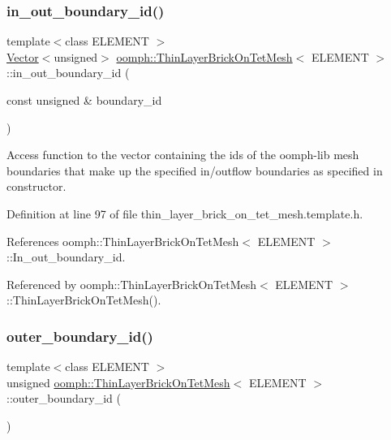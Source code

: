 \subsubsection{\texorpdfstring{in\+\_\+out\+\_\+boundary\+\_\+id()}{in\_out\_boundary\_id()}}
{\footnotesize\ttfamily template$<$class E\+L\+E\+M\+E\+NT $>$ \\
\hyperlink{classoomph_1_1Vector}{Vector}$<$unsigned$>$ \hyperlink{classoomph_1_1ThinLayerBrickOnTetMesh}{oomph\+::\+Thin\+Layer\+Brick\+On\+Tet\+Mesh}$<$ E\+L\+E\+M\+E\+NT $>$\+::in\+\_\+out\+\_\+boundary\+\_\+id (\begin{DoxyParamCaption}\item[{const unsigned \&}]{boundary\+\_\+id }\end{DoxyParamCaption})\hspace{0.3cm}{\ttfamily [inline]}}



Access function to the vector containing the ids of the oomph-\/lib mesh boundaries that make up the specified in/outflow boundaries as specified in constructor. 



Definition at line 97 of file thin\+\_\+layer\+\_\+brick\+\_\+on\+\_\+tet\+\_\+mesh.\+template.\+h.



References oomph\+::\+Thin\+Layer\+Brick\+On\+Tet\+Mesh$<$ E\+L\+E\+M\+E\+N\+T $>$\+::\+In\+\_\+out\+\_\+boundary\+\_\+id.



Referenced by oomph\+::\+Thin\+Layer\+Brick\+On\+Tet\+Mesh$<$ E\+L\+E\+M\+E\+N\+T $>$\+::\+Thin\+Layer\+Brick\+On\+Tet\+Mesh().

\mbox{\label{classoomph_1_1ThinLayerBrickOnTetMesh_aa753cb61dc2b1ed692dff8feeff67930}} 
\subsubsection{\texorpdfstring{outer\+\_\+boundary\+\_\+id()}{outer\_boundary\_id()}}
{\footnotesize\ttfamily template$<$class E\+L\+E\+M\+E\+NT $>$ \\
unsigned \hyperlink{classoomph_1_1ThinLayerBrickOnTetMesh}{oomph\+::\+Thin\+Layer\+Brick\+On\+Tet\+Mesh}$<$ E\+L\+E\+M\+E\+NT $>$\+::outer\+\_\+boundary\+\_\+id (\begin{DoxyParamCaption}{ }\end{DoxyParamCaption})\hspace{0.3cm}{\ttfamily [inline]}}



